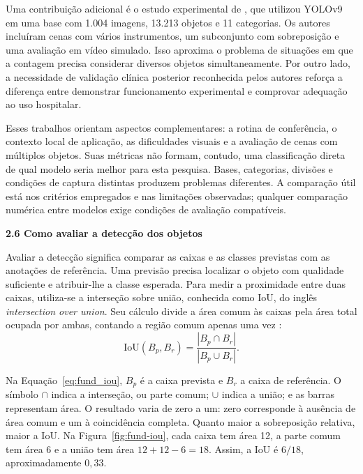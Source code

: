 Uma contribuição adicional é o estudo experimental de \textcite{deol2024}, que utilizou YOLOv9 em uma base com 1.004 imagens, 13.213 objetos e 11 categorias. Os autores incluíram cenas com vários instrumentos, um subconjunto com sobreposição e uma avaliação em vídeo simulado. Isso aproxima o problema de situações em que a contagem precisa considerar diversos objetos simultaneamente. Por outro lado, a necessidade de validação clínica posterior reconhecida pelos autores reforça a diferença entre demonstrar funcionamento experimental e comprovar adequação ao uso hospitalar.

Esses trabalhos orientam aspectos complementares: a rotina de conferência, o contexto local de aplicação, as dificuldades visuais e a avaliação de cenas com múltiplos objetos. Suas métricas não formam, contudo, uma classificação direta de qual modelo seria melhor para esta pesquisa. Bases, categorias, divisões e condições de captura distintas produzem problemas diferentes. A comparação útil está nos critérios empregados e nas limitações observadas; qualquer comparação numérica entre modelos exige condições de avaliação compatíveis.

\vspace{\baselineskip}
{}
\noindent\textbf{2.6 Como avaliar a detecção dos objetos}\par
\vspace{\baselineskip}

Avaliar a detecção significa comparar as caixas e as classes previstas com as anotações de referência. Uma previsão precisa localizar o objeto com qualidade suficiente e atribuir-lhe a classe esperada. Para medir a proximidade entre duas caixas, utiliza-se a interseção sobre união, conhecida como IoU, do inglês \textit{intersection over union}. Seu cálculo divide a área comum às caixas pela área total ocupada por ambas, contando a região comum apenas uma vez \parencite{padilla2021}:
\begin{equation}
\mathrm{IoU}(B_p,B_r)=\frac{|B_p\cap B_r|}{|B_p\cup B_r|}.
\label{eq:fund_iou}
\end{equation}

Na Equação~\ref{eq:fund_iou}, $B_p$ é a caixa prevista e $B_r$ a caixa de referência. O símbolo $\cap$ indica a interseção, ou parte comum; $\cup$ indica a união; e as barras representam área. O resultado varia de zero a um: zero corresponde à ausência de área comum e um à coincidência completa. Quanto maior a sobreposição relativa, maior a IoU. Na Figura~\ref{fig:fund-iou}, cada caixa tem área 12, a parte comum tem área 6 e a união tem área $12+12-6=18$. Assim, a IoU é $6/18$, aproximadamente $0{,}33$.

